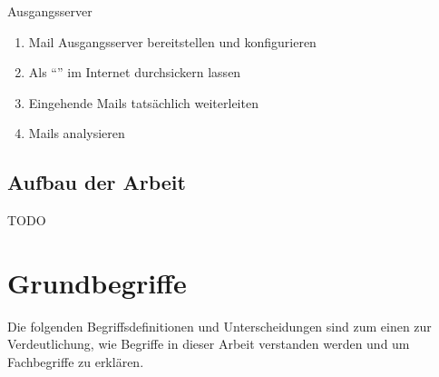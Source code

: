 \documentclass[a4paper,11pt,singlespacing]{article}
\begin{document}
		Ausgangsserver
		\begin{enumerate}
		\item Mail Ausgangsserver bereitstellen und konfigurieren
		\item Als "`"' im Internet durchsickern lassen
		\item Eingehende Mails tatsächlich weiterleiten
		\item Mails analysieren
		\end{enumerate}

	\subsection{Aufbau der Arbeit}\label{sec:EinleitungAufbau}
		TODO


\section{Grundbegriffe}\label{sec:Grundbegriffe}
	Die folgenden Begriffsdefinitionen und Unterscheidungen sind zum einen zur Verdeutlichung, wie Begriffe in dieser Arbeit verstanden werden und um Fachbegriffe zu erklären.
	
\end{document}
